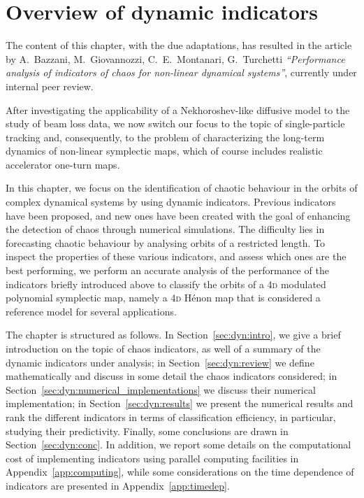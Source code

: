 \chapter{Overview of dynamic indicators}\label{ch:overview_of_dynamic_indicators}
\noindent\textsf{The content of this chapter, with the due adaptations, has resulted in the article by A.\ Bazzani, M.\ Giovannozzi, C.\ E.\ Montanari, G.\ Turchetti \textit{``Performance analysis of indicators of chaos for non-linear dynamical systems''}, currently under internal peer review.}

\vspace{3em}

After investigating the applicability of a Nekhoroshev-like diffusive model to the study of beam loss data, we now switch our focus to the topic of single-particle tracking and, consequently, to the problem of characterizing the long-term dynamics of non-linear symplectic maps, which of course includes realistic accelerator one-turn maps.

In this chapter, we focus on the identification of chaotic behaviour in the orbits of complex dynamical systems by using dynamic indicators. Previous indicators have been proposed, and new ones have been created with the goal of enhancing the detection of chaos through numerical simulations. The difficulty lies in forecasting chaotic behaviour by analysing orbits of a restricted length. To inspect the properties of these various indicators, and assess which ones are the best performing, we perform an accurate analysis of the performance of the indicators briefly introduced above to classify the orbits of a 4\textsc{d} modulated polynomial symplectic map, namely a 4\textsc{d} H\'enon map that is considered a reference model for several applications. 

The chapter is structured as follows. In Section~\ref{sec:dyn:intro}, we give a brief introduction on the topic of chaos indicators, as well of a summary of the dynamic indicators under analysis; in Section~\ref{sec:dyn:review} we define mathematically and discuss in some detail the chaos indicators considered; in Section~\ref{sec:dyn:numerical_implementations} we discuss their numerical implementation; in Section~\ref{sec:dyn:results} we present the numerical results and rank the different indicators in terms of classification efficiency, in particular, studying their predictivity. Finally, some conclusions are drawn in Section~\ref{sec:dyn:conc}. In addition, we report some details on the computational cost of implementing indicators using parallel computing facilities in Appendix~\ref{app:computing}, while some considerations on the time dependence of indicators are presented in Appendix~\ref{app:timedep}. 

